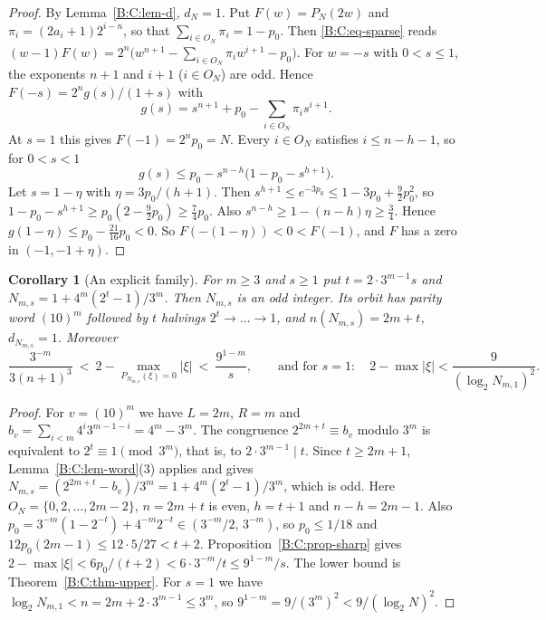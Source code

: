 \documentclass[11pt,a4paper]{article}
\newtheorem{corollary}[theorem]{Corollary}
\theoremstyle{definition}
\theoremstyle{remark}
\numberwithin{equation}{section}
\begin{document}
\begin{proof}
By Lemma~\ref{B:C:lem-d}, $d_N=1$.  Put $F(w)=P_N(2w)$ and $\pi_i=(2a_i+1)2^{i-n}$,
so that $\sum_{i\in O_N}\pi_i=1-p_0$.  Then \eqref{B:C:eq-sparse} reads
$(w-1)F(w)=2^n\bigl(w^{n+1}-\sum_{i\in O_N}\pi_iw^{i+1}-p_0\bigr)$.  For $w=-s$
with $0<s\le1$, the exponents $n+1$ and $i+1$ ($i\in O_N$) are odd.  Hence
$F(-s)=2^ng(s)/(1+s)$ with
\[
g(s)=s^{n+1}+p_0-\sum_{i\in O_N}\pi_is^{i+1} .
\]
At $s=1$ this gives $F(-1)=2^np_0=N$.  Every $i\in O_N$ satisfies $i\le n-h-1$,
so for $0<s<1$
\[
g(s)\le p_0-s^{n-h}\bigl(1-p_0-s^{h+1}\bigr).
\]
Let $s=1-\eta$ with $\eta=3p_0/(h+1)$.  Then
$s^{h+1}\le e^{-3p_0}\le1-3p_0+\tfrac92p_0^2$, so
$1-p_0-s^{h+1}\ge p_0(2-\tfrac92p_0)\ge\tfrac74p_0$.  Also
$s^{n-h}\ge1-(n-h)\eta\ge\tfrac34$.  Hence $g(1-\eta)\le p_0-\tfrac{21}{16}p_0<0$.
So $F(-(1-\eta))<0<F(-1)$, and $F$ has a zero in $(-1,-1+\eta)$.
\end{proof}

\begin{corollary}[An explicit family]\label{B:C:cor-sharp-family}
For $m\ge3$ and $s\ge1$ put $t=2\cdot3^{m-1}s$ and
$N_{m,s}=1+4^m(2^t-1)/3^m$.  Then $N_{m,s}$ is an odd integer.  Its orbit has
parity word $(10)^m$ followed by $t$ halvings $2^t\to\dots\to1$, and
$n(N_{m,s})=2m+t$, $d_{N_{m,s}}=1$.  Moreover
\[
\frac{3^{-m}}{3(n+1)^3}\ <\ 2-\max_{P_{N_{m,s}}(\xi)=0}|\xi|\ <\ \frac{9^{1-m}}{s},
\qquad\text{and for }s=1:\quad 2-\max|\xi|<\frac{9}{(\log_2N_{m,1})^2}.
\]
\end{corollary}

\begin{proof}
For $v=(10)^m$ we have $L=2m$, $R=m$ and
$b_v=\sum_{i<m}4^i3^{m-1-i}=4^m-3^m$.  The congruence $2^{2m+t}\equiv b_v$
modulo $3^m$ is equivalent to $2^t\equiv1\pmod{3^m}$, that is, to
$2\cdot3^{m-1}\mid t$.  Since $t\ge2m+1$, Lemma~\ref{B:C:lem-word}(3) applies and
gives $N_{m,s}=(2^{2m+t}-b_v)/3^m=1+4^m(2^t-1)/3^m$, which is odd.  Here
$O_N=\{0,2,\dots,2m-2\}$, $n=2m+t$ is even, $h=t+1$ and $n-h=2m-1$.  Also
$p_0=3^{-m}(1-2^{-t})+4^{-m}2^{-t}\in(3^{-m}/2,\,3^{-m})$, so $p_0\le1/18$ and
$12p_0(2m-1)\le12\cdot5/27<t+2$.  Proposition~\ref{B:C:prop-sharp} gives
$2-\max|\xi|<6p_0/(t+2)<6\cdot3^{-m}/t\le9^{1-m}/s$.  The lower bound is
Theorem~\ref{B:C:thm-upper}.  For $s=1$ we have
$\log_2N_{m,1}<n=2m+2\cdot3^{m-1}\le3^m$, so $9^{1-m}=9/(3^m)^2<9/(\log_2N)^2$.
\end{proof}
\end{document}
